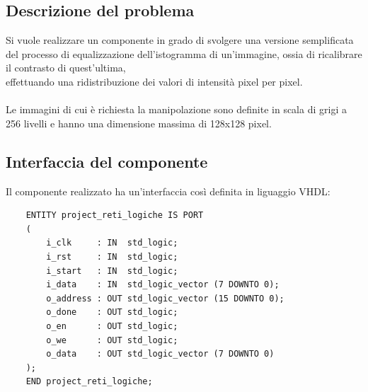 \documentclass{article}
\begin{document}
\subsection{Descrizione del problema} %
Si vuole realizzare un componente in grado di svolgere una versione semplificata del processo di equalizzazione dell’istogramma di un’immagine, ossia di ricalibrare il contrasto di quest’ultima, \\effettuando una ridistribuzione dei valori di intensità pixel per pixel. \\\\
Le immagini di cui è richiesta la manipolazione sono definite in scala di grigi a 256 livelli e hanno una dimensione massima di 128x128 pixel.

\vspace{0,5cm} %

\subsection{Interfaccia del componente} %
Il componente realizzato ha un’interfaccia così definita in liguaggio VHDL:

\begin{verbatim}
    ENTITY project_reti_logiche IS PORT
	(
		i_clk     : IN  std_logic;
		i_rst     : IN  std_logic; 
		i_start   : IN  std_logic; 
		i_data    : IN  std_logic_vector (7 DOWNTO 0);
		o_address : OUT std_logic_vector (15 DOWNTO 0);
		o_done    : OUT std_logic; 
		o_en      : OUT std_logic;
		o_we      : OUT std_logic;
		o_data    : OUT std_logic_vector (7 DOWNTO 0) 
	);
    END project_reti_logiche;
\end{verbatim}

\vspace{0,5cm} %
\end{document}
